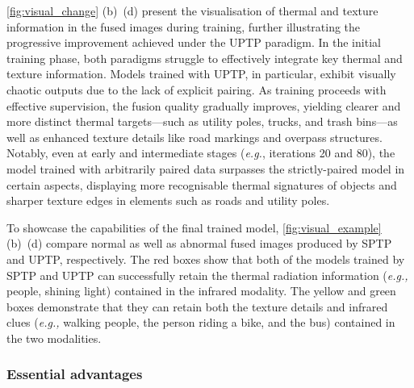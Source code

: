 \cref{fig:visual_change} (b)~(d) present the visualisation of thermal and texture information in the fused images during training, further illustrating the progressive improvement achieved under the UPTP paradigm. 
In the initial training phase, both paradigms struggle to effectively integrate key thermal and texture information. 
Models trained with UPTP, in particular, exhibit visually chaotic outputs due to the lack of explicit pairing. 
As training proceeds with effective supervision, the fusion quality gradually improves, yielding clearer and more distinct thermal targets—such as utility poles, trucks, and trash bins—as well as enhanced texture details like road markings and overpass structures. 
Notably, even at early and intermediate stages (\textit{e.g.}, iterations 20 and 80), the model trained with arbitrarily paired data surpasses the strictly-paired model in certain aspects, displaying more recognisable thermal signatures of objects and sharper texture edges in elements such as roads and utility poles.

To showcase the capabilities of the final trained model, \cref{fig:visual_example}(b)~(d) compare normal as well as abnormal fused images produced by SPTP and UPTP, respectively.
The red boxes show that both of the models trained by SPTP and UPTP can successfully retain the thermal radiation information ({\em e.g.,} people, shining light) contained in the infrared modality. 
The yellow and green boxes demonstrate that they can retain both the texture details and infrared clues ({\em e.g.,} walking people, the person riding a bike, and the bus) contained in the two modalities. 

\subsubsection{Essential advantages}



